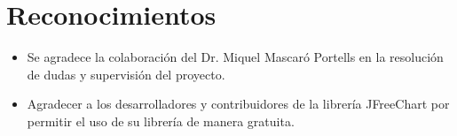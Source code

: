\documentclass[12pt,journal,compsoc]{IEEEtran}
\begin{document}
\section*{Reconocimientos}
\begin{itemize}
    \item Se agradece la colaboración del Dr. Miquel Mascaró Portells en la resolución de dudas y supervisión del proyecto.
    \item Agradecer a los desarrolladores y contribuidores de la librería JFreeChart por permitir el uso de su librería de manera gratuita.
\end{itemize}
\end{document}
